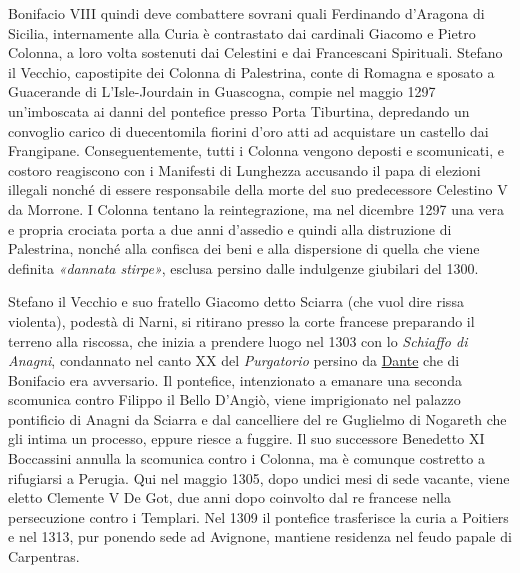 \documentclass[
  letterpaper,
  DIV=11,
  numbers=noendperiod]{scrartcl}
\begin{document}
Bonifacio VIII quindi deve combattere sovrani quali Ferdinando d'Aragona
di Sicilia, internamente alla Curia è contrastato dai cardinali Giacomo
e Pietro Colonna, a loro volta sostenuti dai Celestini e dai Francescani
Spirituali. Stefano il Vecchio, capostipite dei Colonna di Palestrina,
conte di Romagna e sposato a Guacerande di L'Isle-Jourdain in Guascogna,
compie nel maggio 1297 un'imboscata ai danni del pontefice presso Porta
Tiburtina, depredando un convoglio carico di duecentomila fiorini d'oro
atti ad acquistare un castello dai Frangipane. Conseguentemente, tutti i
Colonna vengono deposti e scomunicati, e costoro reagiscono con i
Manifesti di Lunghezza accusando il papa di elezioni illegali nonché di
essere responsabile della morte del suo predecessore Celestino V da
Morrone. I Colonna tentano la reintegrazione, ma nel dicembre 1297 una
vera e propria crociata porta a due anni d'assedio e quindi alla
distruzione di Palestrina, nonché alla confisca dei beni e alla
dispersione di quella che viene definita \emph{«dannata stirpe»},
esclusa persino dalle indulgenze giubilari del 1300.

Stefano il Vecchio e suo fratello Giacomo detto Sciarra (che vuol dire
rissa violenta), podestà di Narni, si ritirano presso la corte francese
preparando il terreno alla riscossa, che inizia a prendere luogo nel
1303 con lo \emph{Schiaffo di Anagni}, condannato nel canto XX del
\emph{Purgatorio} persino da
\href{2024-05-27-dante-islam-comandini.html}{Dante} che di Bonifacio era
avversario. Il pontefice, intenzionato a emanare una seconda scomunica
contro Filippo il Bello D'Angiò, viene imprigionato nel palazzo
pontificio di Anagni da Sciarra e dal cancelliere del re Guglielmo di
Nogareth che gli intima un processo, eppure riesce a fuggire. Il suo
successore Benedetto XI Boccassini annulla la scomunica contro i
Colonna, ma è comunque costretto a rifugiarsi a Perugia. Qui nel maggio
1305, dopo undici mesi di sede vacante, viene eletto Clemente V De Got,
due anni dopo coinvolto dal re francese nella persecuzione contro i
Templari. Nel 1309 il pontefice trasferisce la curia a Poitiers e nel
1313, pur ponendo sede ad Avignone, mantiene residenza nel feudo papale
di Carpentras.
\end{document}
